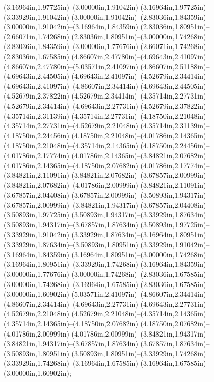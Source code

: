 (3.16964in,1.97725in)--(3.00000in,1.91042in) (3.16964in,1.97725in)--(3.33929in,1.91042in) (3.00000in,1.91042in)--(2.83036in,1.84359in) (3.00000in,1.91042in)--(3.16964in,1.84359in) (2.83036in,1.80951in)--(2.66071in,1.74268in) (2.83036in,1.80951in)--(3.00000in,1.74268in) (2.83036in,1.84359in)--(3.00000in,1.77676in) (2.66071in,1.74268in)--(2.83036in,1.67585in) (4.86607in,2.47780in)--(4.69643in,2.41097in) (4.86607in,2.47780in)--(5.03571in,2.41097in) (4.86607in,2.51188in)--(4.69643in,2.44505in) (4.69643in,2.41097in)--(4.52679in,2.34414in) (4.69643in,2.41097in)--(4.86607in,2.34414in) (4.69643in,2.44505in)--(4.52679in,2.37822in) (4.52679in,2.34414in)--(4.35714in,2.27731in) (4.52679in,2.34414in)--(4.69643in,2.27731in) (4.52679in,2.37822in)--(4.35714in,2.31139in) (4.35714in,2.27731in)--(4.18750in,2.21048in) (4.35714in,2.27731in)--(4.52679in,2.21048in) (4.35714in,2.31139in)--(4.18750in,2.24456in) (4.18750in,2.21048in)--(4.01786in,2.14365in) (4.18750in,2.21048in)--(4.35714in,2.14365in) (4.18750in,2.24456in)--(4.01786in,2.17774in) (4.01786in,2.14365in)--(3.84821in,2.07682in) (4.01786in,2.14365in)--(4.18750in,2.07682in) (4.01786in,2.17774in)--(3.84821in,2.11091in) (3.84821in,2.07682in)--(3.67857in,2.00999in) (3.84821in,2.07682in)--(4.01786in,2.00999in) (3.84821in,2.11091in)--(3.67857in,2.04408in) (3.67857in,2.00999in)--(3.50893in,1.94317in) (3.67857in,2.00999in)--(3.84821in,1.94317in) (3.67857in,2.04408in)--(3.50893in,1.97725in) (3.50893in,1.94317in)--(3.33929in,1.87634in) (3.50893in,1.94317in)--(3.67857in,1.87634in) (3.50893in,1.97725in)--(3.33929in,1.91042in) (3.33929in,1.87634in)--(3.16964in,1.80951in) (3.33929in,1.87634in)--(3.50893in,1.80951in) (3.33929in,1.91042in)--(3.16964in,1.84359in) (3.16964in,1.80951in)--(3.00000in,1.74268in) (3.16964in,1.80951in)--(3.33929in,1.74268in) (3.16964in,1.84359in)--(3.00000in,1.77676in) (3.00000in,1.74268in)--(2.83036in,1.67585in) (3.00000in,1.74268in)--(3.16964in,1.67585in) (2.83036in,1.67585in)--(3.00000in,1.60902in) (5.03571in,2.41097in)--(4.86607in,2.34414in) (4.86607in,2.34414in)--(4.69643in,2.27731in) (4.69643in,2.27731in)--(4.52679in,2.21048in) (4.52679in,2.21048in)--(4.35714in,2.14365in) (4.35714in,2.14365in)--(4.18750in,2.07682in) (4.18750in,2.07682in)--(4.01786in,2.00999in) (4.01786in,2.00999in)--(3.84821in,1.94317in) (3.84821in,1.94317in)--(3.67857in,1.87634in) (3.67857in,1.87634in)--(3.50893in,1.80951in) (3.50893in,1.80951in)--(3.33929in,1.74268in) (3.33929in,1.74268in)--(3.16964in,1.67585in) (3.16964in,1.67585in)--(3.00000in,1.60902in);
